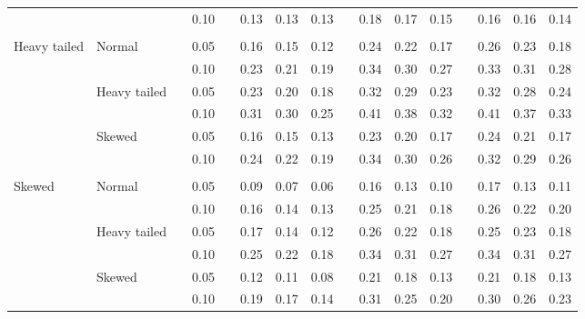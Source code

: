 \documentclass{article} %
\begin{document}
\begin{table}[ht]
\begin{scriptsize}
\begin{center}
\begin{tabular}{ll p{.1cm} c p{.1cm} rrr p{.1cm} rrr p{.1cm} rrr}
\rowcolor{gray!20}             &              && 0.10 &&   0.13 & 0.13 & 0.13 && 0.18 & 0.17 & 0.15 && 0.16 & 0.16 & 0.14 \\ 
             &&&&&&&&&&&&&&&\\
Heavy tailed & Normal       && 0.05 &&   0.16 & 0.15 & 0.12 && 0.24 & 0.22 & 0.17 &&  0.26 & 0.23 & 0.18 \\
             &              && 0.10 &&   0.23 & 0.21 & 0.19 && 0.34 & 0.30 & 0.27 &&  0.33 & 0.31 & 0.28 \\
             & Heavy tailed && 0.05 &&   0.23 & 0.20 & 0.18 && 0.32 & 0.29 & 0.23 &&  0.32 & 0.28 & 0.24 \\
             &              && 0.10 &&   0.31 & 0.30 & 0.25 && 0.41 & 0.38 & 0.32 &&  0.41 & 0.37 & 0.33 \\
             & Skewed       && 0.05 &&   0.16 & 0.15 & 0.13 && 0.23 & 0.20 & 0.17 &&  0.24 & 0.21 & 0.17 \\
             &              && 0.10 &&   0.24 & 0.22 & 0.19 && 0.34 & 0.30 & 0.26 &&  0.32 & 0.29 & 0.26 \\
             &&&&&&&&&&&&&&&\\ 
Skewed       & Normal       && 0.05 &&   0.09 & 0.07 & 0.06 && 0.16 & 0.13 & 0.10 && 0.17 & 0.13 & 0.11 \\ 
             &              && 0.10 &&   0.16 & 0.14 & 0.13 && 0.25 & 0.21 & 0.18 && 0.26 & 0.22 & 0.20 \\ 
             & Heavy tailed && 0.05 &&   0.17 & 0.14 & 0.12 && 0.26 & 0.22 & 0.18 && 0.25 & 0.23 & 0.18 \\ 
             &              && 0.10 &&   0.25 & 0.22 & 0.18 && 0.34 & 0.31 & 0.27 && 0.34 & 0.31 & 0.27 \\ 
             & Skewed       && 0.05 &&   0.12 & 0.11 & 0.08 && 0.21 & 0.18 & 0.13 && 0.21 & 0.18 & 0.13 \\ 
             &              && 0.10 &&   0.19 & 0.17 & 0.14 && 0.31 & 0.25 & 0.20 && 0.30 & 0.26 & 0.23 \\ 



\end{tabular}
\end{center}
\end{scriptsize}
\end{table}
\end{document}
